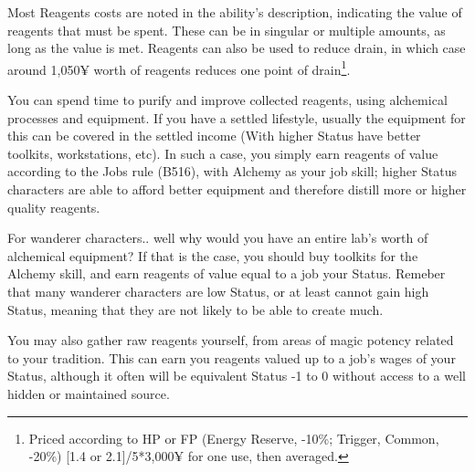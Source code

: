 \begin{multicols*}{2}
	Most Reagents costs are noted in the ability's description, indicating the value of reagents that must be spent. These can be in singular or multiple amounts, as long as the value is met. Reagents can also be used to reduce drain, in which case around 1,050¥ worth of reagents reduces one point of drain\footnote{Priced according to HP or FP (Energy Reserve, -10\%; Trigger, Common, -20\%) [1.4 or 2.1]/5*3,000¥ for one use, then averaged.}.
	
	You can spend time to purify and improve collected reagents, using alchemical processes and equipment. If you have a settled lifestyle, usually the equipment for this can be covered in the settled income (With higher Status have better toolkits, workstations, etc). In such a case, you simply earn reagents of value according to the Jobs rule (B516), with Alchemy as your job skill; higher Status characters are able to afford better equipment and therefore distill more or higher quality reagents. 
	
	For wanderer characters.. well why would you have an entire lab's worth of alchemical equipment? If that is the case, you should buy toolkits for the Alchemy skill, and earn reagents of value equal to a job your Status. Remeber that many wanderer characters are low Status, or at least cannot gain high Status, meaning that they are not likely to be able to create much.
	
	You may also gather raw reagents yourself, from areas of magic potency related to your tradition. This can earn you reagents valued up to a job's wages of your Status, although it often will be equivalent Status -1 to 0 without access to a well hidden or maintained source.
	
\end{multicols*}
